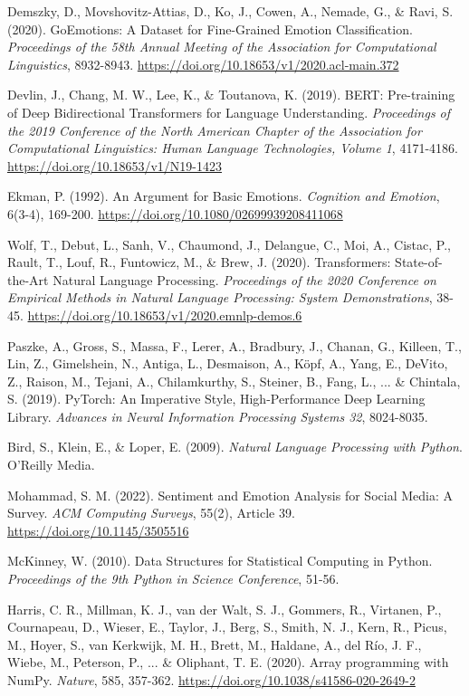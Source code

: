 \documentclass[12pt,a4paper]{report}
\begin{document}
\begin{thebibliography}{99}

 Demszky, D., Movshovitz-Attias, D., Ko, J., Cowen, A., Nemade, G., \& Ravi, S. (2020). GoEmotions: A Dataset for Fine-Grained Emotion Classification. \textit{Proceedings of the 58th Annual Meeting of the Association for Computational Linguistics}, 8932-8943. \url{https://doi.org/10.18653/v1/2020.acl-main.372}

 Devlin, J., Chang, M. W., Lee, K., \& Toutanova, K. (2019). BERT: Pre-training of Deep Bidirectional Transformers for Language Understanding. \textit{Proceedings of the 2019 Conference of the North American Chapter of the Association for Computational Linguistics: Human Language Technologies, Volume 1}, 4171-4186. \url{https://doi.org/10.18653/v1/N19-1423}

 Ekman, P. (1992). An Argument for Basic Emotions. \textit{Cognition and Emotion}, 6(3-4), 169-200. \url{https://doi.org/10.1080/02699939208411068}

 Wolf, T., Debut, L., Sanh, V., Chaumond, J., Delangue, C., Moi, A., Cistac, P., Rault, T., Louf, R., Funtowicz, M., \& Brew, J. (2020). Transformers: State-of-the-Art Natural Language Processing. \textit{Proceedings of the 2020 Conference on Empirical Methods in Natural Language Processing: System Demonstrations}, 38-45. \url{https://doi.org/10.18653/v1/2020.emnlp-demos.6}

 Paszke, A., Gross, S., Massa, F., Lerer, A., Bradbury, J., Chanan, G., Killeen, T., Lin, Z., Gimelshein, N., Antiga, L., Desmaison, A., Köpf, A., Yang, E., DeVito, Z., Raison, M., Tejani, A., Chilamkurthy, S., Steiner, B., Fang, L., ... \& Chintala, S. (2019). PyTorch: An Imperative Style, High-Performance Deep Learning Library. \textit{Advances in Neural Information Processing Systems 32}, 8024-8035.

 Bird, S., Klein, E., \& Loper, E. (2009). \textit{Natural Language Processing with Python}. O'Reilly Media.

 Mohammad, S. M. (2022). Sentiment and Emotion Analysis for Social Media: A Survey. \textit{ACM Computing Surveys}, 55(2), Article 39. \url{https://doi.org/10.1145/3505516}

 McKinney, W. (2010). Data Structures for Statistical Computing in Python. \textit{Proceedings of the 9th Python in Science Conference}, 51-56.

 Harris, C. R., Millman, K. J., van der Walt, S. J., Gommers, R., Virtanen, P., Cournapeau, D., Wieser, E., Taylor, J., Berg, S., Smith, N. J., Kern, R., Picus, M., Hoyer, S., van Kerkwijk, M. H., Brett, M., Haldane, A., del Río, J. F., Wiebe, M., Peterson, P., ... \& Oliphant, T. E. (2020). Array programming with NumPy. \textit{Nature}, 585, 357-362. \url{https://doi.org/10.1038/s41586-020-2649-2}


\end{thebibliography}
\end{document}
